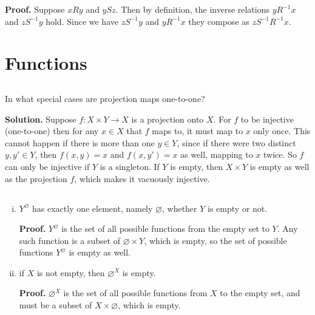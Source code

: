 \documentclass{article}
\begin{document}

\textbf{Proof.} Suppose $xRy$ and $ySz$. Then by definition, the inverse relations $yR^{-1}x$ and $zS^{-1}y$ hold. Since we have $zS^{-1}y$ and $yR^{-1}x$ they compose as $z S^{-1}R^{-1} x$. 

\section{Functions}

\subsection{} In what special cases are projection maps one-to-one?

\textbf{Solution.} Suppose $f: X \times Y \longrightarrow X$ is a projection onto $X$. For $f$ to be injective (one-to-one) then for any $x \in X$ that $f$ maps to, it must map to $x$ only once. This cannot happen if there is more than one $y \in Y$, since if there were two distinct $y, y' \in Y$, then $f(x, y) = x$ and $f(x, y') = x$ as well, mapping to $x$ twice. So $f$ can only be injective if $Y$ is a singleton. If $Y$ is empty, then $X \times Y$ is empty as well as the projection $f$, which makes it vacuously injective.

\subsection{}
\begin{enumerate}[(i)]
    \item $Y^\varnothing$ has exactly one element, namely $\varnothing$, whether $Y$ is empty or not.
    
    \textbf{Proof.} $Y^\varnothing$ is the set of all possible functions from the empty set to $Y$. Any such function is a subset of $\varnothing \times Y$, which is empty, so the set of possible functions $Y^\varnothing$ is empty as well. 

    \item if $X$ is not empty, then $\varnothing^X$ is empty.

    \textbf{Proof.} $\varnothing^X$ is the set of all possible functions from $X$ to the empty set, and must be a subset of $X \times \varnothing$, which is empty.
\end{enumerate}
\end{document}
